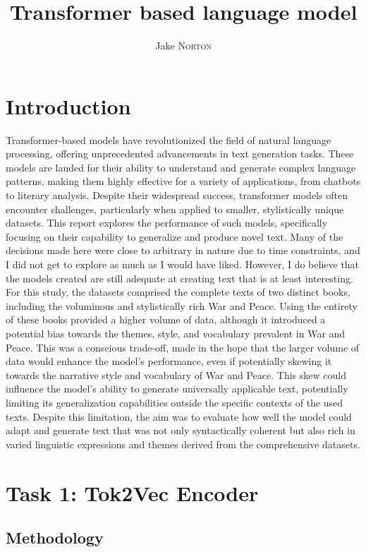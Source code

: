 \documentclass[12pt]{article} \usepackage{COSC420style} \usepackage{soul}
\title{Transformer based language model}
\author{Jake \textsc{Norton}} \studentid{5695756}
\begin{document}
\maketitle

\section{Introduction}

Transformer-based models have revolutionized the field of natural language
processing, offering unprecedented advancements in text generation tasks. These
models are lauded for their ability to understand and generate complex language
patterns, making them highly effective for a variety of applications, from
chatbots to literary analysis. Despite their widespread success, transformer
models often encounter challenges, particularly when applied to smaller,
stylistically unique datasets. This report explores the performance of such
models, specifically focusing on their capability to generalize and produce
novel text. Many of the decisions made here were close to arbitrary in nature
due to time constraints, and I did not get to explore as much as I would have
liked. However, I do believe that the models created are still adequate at
creating text that is at least interesting. For this study, the datasets
comprised the complete texts of two distinct books, including the voluminous and
stylistically rich War and Peace. Using the entirety of these books provided a
higher volume of data, although it introduced a potential bias towards the
themes, style, and vocabulary prevalent in War and Peace. This was a conscious
trade-off, made in the hope that the larger volume of data would enhance the
model’s performance, even if potentially skewing it towards the narrative style
and vocabulary of War and Peace. This skew could influence the model's ability
to generate universally applicable text, potentially limiting its generalization
capabilities outside the specific contexts of the used texts. Despite this
limitation, the aim was to evaluate how well the model could adapt and generate
text that was not only syntactically coherent but also rich in varied linguistic
expressions and themes derived from the comprehensive datasets.

\section{Task 1: Tok2Vec Encoder}

\subsection{Methodology}
\end{document}
